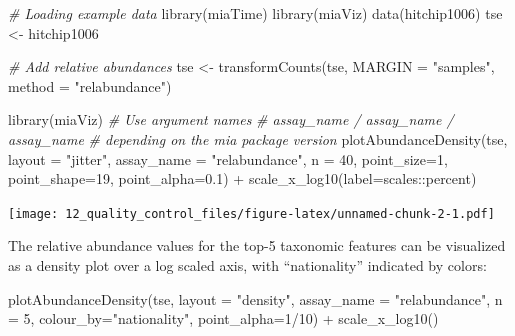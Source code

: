 \documentclass[
]{book}
\newenvironment{Shaded}{\begin{snugshade}}{\end{snugshade}}
\newcommand{\AttributeTok}[1]{\textcolor[rgb]{0.77,0.63,0.00}{#1}}
\newcommand{\CommentTok}[1]{\textcolor[rgb]{0.56,0.35,0.01}{\textit{#1}}}
\newcommand{\DecValTok}[1]{\textcolor[rgb]{0.00,0.00,0.81}{#1}}
\newcommand{\FloatTok}[1]{\textcolor[rgb]{0.00,0.00,0.81}{#1}}
\newcommand{\FunctionTok}[1]{\textcolor[rgb]{0.00,0.00,0.00}{#1}}
\newcommand{\NormalTok}[1]{#1}
\newcommand{\OtherTok}[1]{\textcolor[rgb]{0.56,0.35,0.01}{#1}}
\newcommand{\SpecialCharTok}[1]{\textcolor[rgb]{0.00,0.00,0.00}{#1}}
\newcommand{\StringTok}[1]{\textcolor[rgb]{0.31,0.60,0.02}{#1}}
\begin{document}
\begin{Shaded}
\begin{Highlighting}[]
\CommentTok{\# Loading example data}
\FunctionTok{library}\NormalTok{(miaTime)}
\FunctionTok{library}\NormalTok{(miaViz)}
\FunctionTok{data}\NormalTok{(hitchip1006)}
\NormalTok{tse }\OtherTok{\textless{}{-}}\NormalTok{ hitchip1006}

\CommentTok{\# Add relative abundances}
\NormalTok{tse }\OtherTok{\textless{}{-}} \FunctionTok{transformCounts}\NormalTok{(tse, }\AttributeTok{MARGIN =} \StringTok{"samples"}\NormalTok{, }\AttributeTok{method =} \StringTok{"relabundance"}\NormalTok{)}

\FunctionTok{library}\NormalTok{(miaViz)}
\CommentTok{\# Use argument names}
\CommentTok{\# assay\_name / assay\_name / assay\_name}
\CommentTok{\# depending on the mia package version}
\FunctionTok{plotAbundanceDensity}\NormalTok{(tse, }\AttributeTok{layout =} \StringTok{"jitter"}\NormalTok{, }\AttributeTok{assay\_name =} \StringTok{"relabundance"}\NormalTok{,}
                     \AttributeTok{n =} \DecValTok{40}\NormalTok{, }\AttributeTok{point\_size=}\DecValTok{1}\NormalTok{, }\AttributeTok{point\_shape=}\DecValTok{19}\NormalTok{, }\AttributeTok{point\_alpha=}\FloatTok{0.1}\NormalTok{) }\SpecialCharTok{+} 
                     \FunctionTok{scale\_x\_log10}\NormalTok{(}\AttributeTok{label=}\NormalTok{scales}\SpecialCharTok{::}\NormalTok{percent)}
\end{Highlighting}
\end{Shaded}

\texttt{[image: 12\_quality\_control\_files/figure-latex/unnamed-chunk-2-1.pdf]}

The relative abundance values for the top-5 taxonomic features can be
visualized as a density plot over a log scaled axis, with
``nationality'' indicated by colors:

\begin{Shaded}
\begin{Highlighting}[]
\FunctionTok{plotAbundanceDensity}\NormalTok{(tse, }\AttributeTok{layout =} \StringTok{"density"}\NormalTok{, }\AttributeTok{assay\_name =} \StringTok{"relabundance"}\NormalTok{,}
                     \AttributeTok{n =} \DecValTok{5}\NormalTok{, }\AttributeTok{colour\_by=}\StringTok{"nationality"}\NormalTok{, }\AttributeTok{point\_alpha=}\DecValTok{1}\SpecialCharTok{/}\DecValTok{10}\NormalTok{) }\SpecialCharTok{+}
    \FunctionTok{scale\_x\_log10}\NormalTok{()}
\end{Highlighting}
\end{Shaded}
\end{document}

